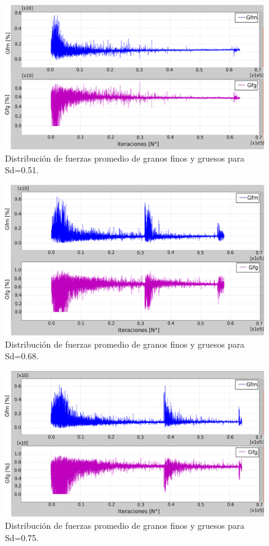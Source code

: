 \begin{figure}[htb]
\centering
\includegraphics[width=\textwidth]{Anexo1/PSD51}
\caption{Distribuci\'on de fuerzas promedio de granos finos y gruesos para Sd=0.51.}
\label{fig:PSD51}
\end{figure}

\begin{figure}[htb]
\centering
\includegraphics[width=\textwidth]{Anexo1/PSD68}
\caption{Distribuci\'on de fuerzas promedio de granos finos y gruesos para Sd=0.68.}
\label{fig:PSD68}
\end{figure}


\begin{figure}[htb]
\centering
\includegraphics[width=\textwidth]{Anexo1/PSD75}
\caption{Distribuci\'on de fuerzas promedio de granos finos y gruesos para Sd=0.75.}
\label{fig:PSD75}
\end{figure}









